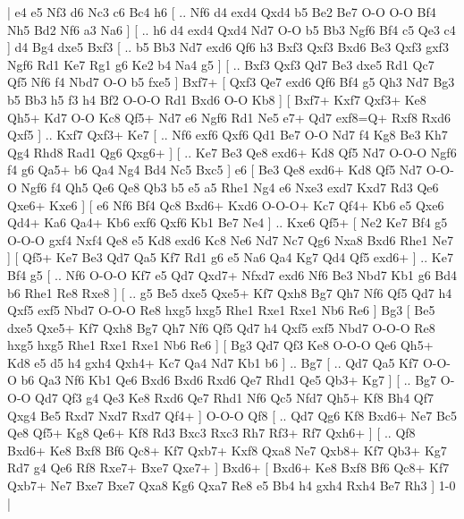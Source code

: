 \makegametitle 
|   e4   e5    Nf3   d6    Nc3   c6    Bc4   h6 [ .. Nf6  d4 exd4  Qxd4 b5  Be2 Be7  O-O O-O  Bf4 Nh5  Bd2 Nf6  a3 Na6   ]  [ .. h6  d4 exd4  Qxd4 Nd7  O-O b5  Bb3 Ngf6  Bf4 c5  Qe3 c4   ]  d4   Bg4    dxe5   Bxf3 [ .. b5  Bb3 Nd7  exd6 Qf6  h3 Bxf3  Qxf3 Bxd6  Be3 Qxf3  gxf3 Ngf6  Rd1 Ke7  Rg1 g6  Ke2 b4  Na4 g5   ]  [ .. Bxf3  Qxf3 Qd7  Be3 dxe5  Rd1 Qc7  Qf5 Nf6  f4 Nbd7  O-O b5  fxe5   ]  Bxf7+ [  Qxf3 Qe7  exd6 Qf6  Bf4 g5  Qh3 Nd7  Bg3 b5  Bb3 h5  f3 h4  Bf2 O-O-O  Rd1 Bxd6  O-O Kb8   ]  [  Bxf7+ Kxf7  Qxf3+ Ke8  Qh5+ Kd7  O-O Kc8  Qf5+ Nd7  e6 Ngf6  Rd1 Ne5  e7+ Qd7  exf8=Q+ Rxf8  Rxd6 Qxf5   ] .. Kxf7    Qxf3+   Ke7 [ .. Nf6  exf6 Qxf6  Qd1 Be7  O-O Nd7  f4 Kg8  Be3 Kh7  Qg4 Rhd8  Rad1 Qg6  Qxg6+   ]  [ .. Ke7  Be3 Qe8  exd6+ Kd8  Qf5 Nd7  O-O-O Ngf6  f4 g6  Qa5+ b6  Qa4 Ng4  Bd4 Nc5  Bxc5   ]  e6 [  Be3 Qe8  exd6+ Kd8  Qf5 Nd7  O-O-O Ngf6  f4 Qh5  Qe6 Qe8  Qb3 b5  e5 a5  Rhe1 Ng4  e6 Nxe3  exd7 Kxd7  Rd3 Qe6  Qxe6+ Kxe6   ]  [  e6 Nf6  Bf4 Qc8  Bxd6+ Kxd6  O-O-O+ Kc7  Qf4+ Kb6  e5 Qxe6  Qd4+ Ka6  Qa4+ Kb6  exf6 Qxf6  Kb1 Be7  Ne4   ] .. Kxe6    Qf5+ [  Ne2 Ke7  Bf4 g5  O-O-O gxf4  Nxf4 Qe8  e5 Kd8  exd6 Kc8  Ne6 Nd7  Nc7 Qg6  Nxa8 Bxd6  Rhe1 Ne7   ]  [  Qf5+ Ke7  Be3 Qd7  Qa5 Kf7  Rd1 g6  e5 Na6  Qa4 Kg7  Qd4 Qf5  exd6+   ] .. Ke7   Bf4   g5 [ .. Nf6  O-O-O Kf7  e5 Qd7  Qxd7+ Nfxd7  exd6 Nf6  Be3 Nbd7  Kb1 g6  Bd4 b6  Rhe1 Re8  Rxe8   ]  [ .. g5  Be5 dxe5  Qxe5+ Kf7  Qxh8 Bg7  Qh7 Nf6  Qf5 Qd7  h4 Qxf5  exf5 Nbd7  O-O-O Re8  hxg5 hxg5  Rhe1 Rxe1  Rxe1 Nb6  Re6   ]  Bg3 [  Be5 dxe5  Qxe5+ Kf7  Qxh8 Bg7  Qh7 Nf6  Qf5 Qd7  h4 Qxf5  exf5 Nbd7  O-O-O Re8  hxg5 hxg5  Rhe1 Rxe1  Rxe1 Nb6  Re6   ]  [  Bg3 Qd7  Qf3 Ke8  O-O-O Qe6  Qh5+ Kd8  e5 d5  h4 gxh4  Qxh4+ Kc7  Qa4 Nd7  Kb1 b6   ] .. Bg7 [ .. Qd7  Qa5 Kf7  O-O-O b6  Qa3 Nf6  Kb1 Qe6  Bxd6 Bxd6  Rxd6 Qe7  Rhd1 Qe5  Qb3+ Kg7   ]  [ .. Bg7  O-O-O Qd7  Qf3 g4  Qe3 Ke8  Rxd6 Qe7  Rhd1 Nf6  Qc5 Nfd7  Qh5+ Kf8  Bh4 Qf7  Qxg4 Be5  Rxd7 Nxd7  Rxd7 Qf4+   ]  O-O-O   Qf8 [ .. Qd7  Qg6 Kf8  Bxd6+ Ne7  Bc5 Qe8  Qf5+ Kg8  Qe6+ Kf8  Rd3 Bxc3  Rxc3 Rh7  Rf3+ Rf7  Qxh6+   ]  [ .. Qf8  Bxd6+ Ke8  Bxf8 Bf6  Qc8+ Kf7  Qxb7+ Kxf8  Qxa8 Ne7  Qxb8+ Kf7  Qb3+ Kg7  Rd7 g4  Qe6 Rf8  Rxe7+ Bxe7  Qxe7+   ]  Bxd6+    [  Bxd6+ Ke8  Bxf8 Bf6  Qc8+ Kf7  Qxb7+ Ne7  Bxe7 Bxe7  Qxa8 Kg6  Qxa7 Re8  e5 Bb4  h4 gxh4  Rxh4 Be7  Rh3   ] 1-0  |
